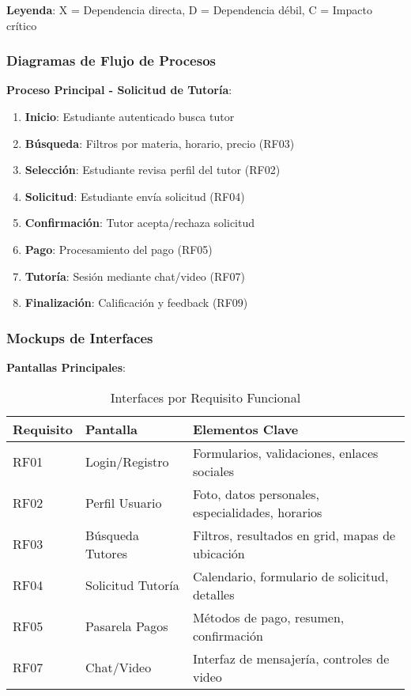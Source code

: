 \documentclass[12pt,a4paper]{article}
\begin{document}
\textbf{Leyenda}: X = Dependencia directa, D = Dependencia débil, C = Impacto crítico

\subsubsection{Diagramas de Flujo de Procesos}

\textbf{Proceso Principal - Solicitud de Tutoría}:

\begin{enumerate}
    \item \textbf{Inicio}: Estudiante autenticado busca tutor
    \item \textbf{Búsqueda}: Filtros por materia, horario, precio (RF03)
    \item \textbf{Selección}: Estudiante revisa perfil del tutor (RF02)
    \item \textbf{Solicitud}: Estudiante envía solicitud (RF04)
    \item \textbf{Confirmación}: Tutor acepta/rechaza solicitud
    \item \textbf{Pago}: Procesamiento del pago (RF05)
    \item \textbf{Tutoría}: Sesión mediante chat/video (RF07)
    \item \textbf{Finalización}: Calificación y feedback (RF09)
\end{enumerate}

\subsubsection{Mockups de Interfaces}

\textbf{Pantallas Principales}:

\begin{table}[H]
\centering
\caption{Interfaces por Requisito Funcional}
\begin{tabular}{|p{3cm}|p{4cm}|p{7cm}|}
\hline
\rowcolor{headercolor!30}
\textbf{\color{white}Requisito} & \textbf{\color{white}Pantalla} & \textbf{\color{white}Elementos Clave} \\
\hline
RF01 & Login/Registro & Formularios, validaciones, enlaces sociales \\
\hline
RF02 & Perfil Usuario & Foto, datos personales, especialidades, horarios \\
\hline
RF03 & Búsqueda Tutores & Filtros, resultados en grid, mapas de ubicación \\
\hline
RF04 & Solicitud Tutoría & Calendario, formulario de solicitud, detalles \\
\hline
RF05 & Pasarela Pagos & Métodos de pago, resumen, confirmación \\
\hline
RF07 & Chat/Video & Interfaz de mensajería, controles de video \\
\hline
\end{tabular}
\end{table}
\end{document}
